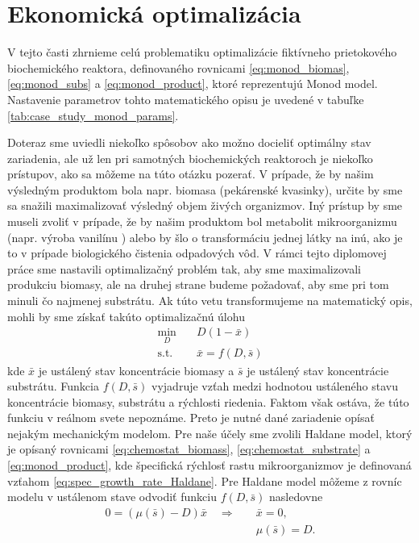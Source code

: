 \section{Ekonomická optimalizácia}
V tejto časti zhrnieme celú problematiku optimalizácie fiktívneho prietokového biochemického reaktora, definovaného rovnicami \eqref{eq:monod_biomas}, \eqref{eq:monod_subs} a \eqref{eq:monod_product}, ktoré reprezentujú Monod model. Nastavenie parametrov tohto matematického opisu je uvedené v tabuľke \ref{tab:case_study_monod_params}.

Doteraz sme uviedli niekoľko spôsobov ako možno docieliť optimálny stav zariadenia, ale už len pri samotných biochemických reaktoroch je niekoľko prístupov, ako sa môžeme na túto otázku pozerať. V prípade, že by našim výsledným produktom bola napr. biomasa (pekárenské kvasinky), určite by sme sa snažili maximalizovať výsledný objem živých organizmov. Iný prístup by sme museli zvoliť v prípade, že by našim produktom bol metabolit mikroorganizmu (napr. výroba vanilínu \cite{hansen:vanilin_biosyn:2009}) alebo by šlo o transformáciu jednej látky na inú, ako je to v prípade biologického čistenia odpadových vôd. V rámci tejto diplomovej práce sme nastavili optimalizačný problém tak, aby sme maximalizovali produkciu biomasy, ale na druhej strane budeme požadovať, aby sme pri tom minuli čo najmenej substrátu. Ak túto vetu transformujeme na matematický opis, mohli by sme získať takúto optimalizačnú úlohu
\begin{equation}
	\label{eq:chemostat_opt}
	\begin{split}
		\min_{D} &\quad D\left(1-\bar{x}\right) \\
		\text{s.t.} &\quad \bar{x} = f(D,\bar{s})
	\end{split}
\end{equation}
kde $ \bar{x} $ je ustálený stav koncentrácie biomasy a $ \bar{s} $ je ustálený stav koncentrácie substrátu. Funkcia $ f(D,\bar{s}) $ vyjadruje vzťah medzi hodnotou ustáleného stavu koncentrácie biomasy, substrátu a rýchlosti riedenia. Faktom však ostáva, že túto funkciu v reálnom svete nepoznáme. Preto je nutné dané zariadenie opísať nejakým mechanickým modelom. Pre naše účely sme zvolili Haldane model, ktorý je opísaný rovnicami \eqref{eq:chemostat_biomass}, \eqref{eq:chemostat_substrate} a \eqref{eq:monod_product}, kde špecifická rýchlosť rastu mikroorganizmov je definovaná vzťahom \eqref{eq:spec_growth_rate_Haldane}. Pre Haldane model môžeme z rovníc modelu v ustálenom stave odvodiť funkciu $ f(D,\bar{s}) $ nasledovne
\begin{align*}
	0 = \left(\mu(\bar{s})-D\right)\bar{x} \quad \Longrightarrow \quad &\bar{x}=0, \\
	&\mu(\bar{s})=D.
\end{align*}

